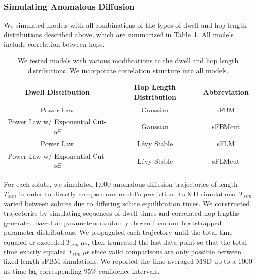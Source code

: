 \documentclass{article}
\begin{document}
  
  \subsubsection*{Simulating Anomalous Diffusion}

  We simulated models with all combinations of the types of dwell and hop length
  distributions described above, which are summarized in Table~\ref{table:anomalous_models}.
  All models include correlation between hops.

  \begin{table}[!htb]
	  \centering
	  \begin{tabular}{|c|c|c|}
	  \hline
	  Dwell Distribution                & Hop Length Distribution & Abbreviation \\
	  \hline
      Power Law                         & Gaussian                & sFBM         \\
      Power Law w/ Exponential Cut-off  & Gaussian                & sFBMcut      \\
      Power Law                         & L\'evy Stable           & sFLM         \\
      Power Law w/ Exponential Cut-off  & L\'evy Stable           & sFLMcut      \\
	  \hline
	  \end{tabular}
	  \caption{We tested models with various modifications to the dwell and hop
	  length distributions. We incorporate correlation structure into all models.}\label{table:anomalous_models}
 \end{table}

  For each solute, we simulated 1,000 anomalous diffusion trajectories of length
  $T_{sim}$ in order to directly compare our model's predictions to MD simulations.
  $T_{sim}$ varied 
  between solutes
  due to differing solute equilibration times. We constructed 
  trajectories by simulating sequences of dwell times and correlated hop lengths
  generated based on parameters randomly chosen from our bootstrapped parameter 
  distributions. We propagated each trajectory until the total time equaled or 
  exceeded $T_{sim}~ \mu$s, then truncated the last data point so that the total 
  time exactly equaled $T_{sim}~ \mu$s since valid comparisons are only possible 
  between fixed length sFBM simulations. 
  We reported the time-averaged MSD up to a 1000 ns time lag corresponding 95\% confidence
  intervals. 
  
\end{document}
